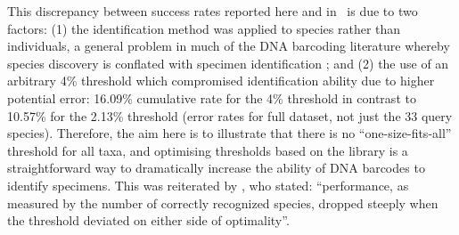 \documentclass[12pt]{article}
\begin{document}
This discrepancy between success rates reported here and in \citeauthor{Dowton2014}\ is due to two factors: (1) the identification method was applied to species rather than individuals, a general problem in much of the DNA barcoding literature whereby species discovery is conflated with specimen identification \citep{Collins2013}; and (2) the use of an arbitrary 4\% threshold which compromised identification ability due to higher potential error: 16.09\% cumulative rate for the 4\% threshold in contrast to 10.57\% for the 2.13\% threshold (error rates for full dataset, not just the 33 query species). 
Therefore, the aim here is to illustrate that there is no ``one-size-fits-all'' threshold for all taxa, and optimising thresholds based on the library is a straightforward way to dramatically increase the ability of DNA barcodes to identify specimens. This was reiterated by \citet{Ratnasingham2013}, who stated: ``performance, as measured by the number of correctly recognized species, dropped steeply when the threshold deviated on either side of optimality''.
\end{document}
